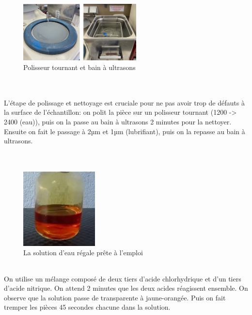 
\begin{figure}[H]
    \centering
    \includegraphics[width=0.55\textwidth]{images/WechatIMG1126.jpeg}
    \caption{Polisseur tournant et bain à ultrasons}
    \label{fig:polisseur_bain_ultrasons}
\end{figure}

\\\\
L'étape de polissage et nettoyage est cruciale pour ne pas avoir 
trop de défauts à la surface de l'échantillon:
on polit la pièce sur un polisseur tournant (1200 -> 2400 (eau)), puis on la passe au bain à ultrasons 2 minutes pour la nettoyer.
Ensuite on fait le passage à 2µm et 1µm (lubrifiant),
puis on la repasse au bain à ultrasons.\\
\\
\\

\begin{figure}[H]
    \centering
    \includegraphics[width=0.35\textwidth]{images/WechatIMG1128.jpeg}
    \caption{La solution d'eau régale prête à l'emploi}
    \label{<label>}
\end{figure}
\\
On utilise un mélange composé de deux tiers d'acide chlorhydrique 
et d'un tiers d'acide nitrique.
On attend 2 minutes que les deux acides réagissent ensemble.
On observe que la solution passe de transparente à jaune-orangée.
Puis on fait tremper les pièces 45 secondes chacune dans la solution.
\\


